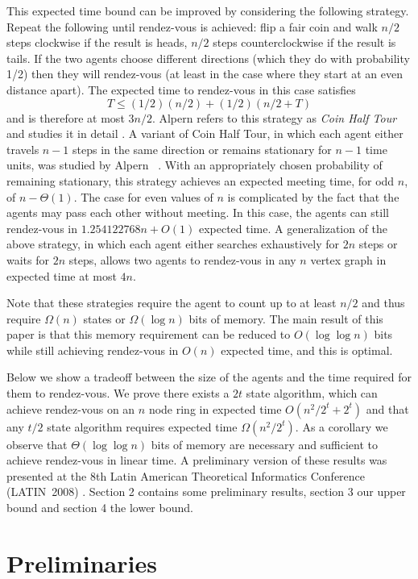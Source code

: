\documentclass{patmorin}
\begin{document}
This expected time bound can be improved by considering the following
strategy.  Repeat the following until rendez-vous is achieved: flip a
fair coin and walk $n/2$ steps clockwise if the result is heads, $n/2$
steps counterclockwise if the result is tails.  If the two agents choose
different directions (which they do with probability 1/2) then they will
rendez-vous (at least in the case where they start at an even distance
apart).  The expected time to rendez-vous in this case satisfies 
\[
  T \le (1/2)(n/2) + (1/2)(n/2+T)
\]
and is therefore at most $3n/2$.  Alpern refers to this strategy
as \emph{Coin Half Tour} and studies it in detail \cite{alpern95}.
A variant of Coin Half Tour, in which each agent either travels $n-1$
steps in the same direction or remains stationary for $n-1$ time units,
was studied by Alpern \etal\ \cite{abe99}.  With an appropriately chosen
probability of remaining stationary, this strategy achieves an expected
meeting time, for odd $n$, of $n-\Theta(1)$. The case for even values
of $n$ is complicated by the fact that the agents may pass each other
without meeting. In this case, the agents can still rendez-vous in
$1.254122768n + O(1)$ expected time.  A generalization of the above
strategy, in which each agent either searches exhaustively for $2n$
steps or waits for $2n$ steps, allows two agents to rendez-vous in any
$n$ vertex graph \cite[Section~4]{abe99}in expected time at most $4n$.

Note that these strategies require the agent to count up to at least $n/2$
and thus require $\Omega(n)$ states or $\Omega(\log n)$ bits of memory.
The main result of this paper is that this memory requirement can be
reduced to $O(\log\log n)$ bits while still achieving rendez-vous in
$O(n)$ expected time, and this is optimal.

Below we show a tradeoff between the size of the agents and the time
required for them to rendez-vous. We prove there exists a $2t$ state
algorithm,   which can achieve rendez-vous on an $n$ node ring in
expected time $O(n^2/2^{t} + 2^{t} )$ and that any $t/2$ state
algorithm requires expected time $\Omega( n^2/2^t )$.  As a corollary
we observe that $\Theta(\log \log n)$ bits of memory are necessary and
sufficient to achieve rendez-vous in linear time.  A preliminary
version of these results was presented at the 8th Latin American
Theoretical Informatics Conference (LATIN~2008) \cite{latin}. Section
2 contains some preliminary results, section 3 our upper bound and
section 4 the lower bound.   


\section{Preliminaries}
\end{document}
